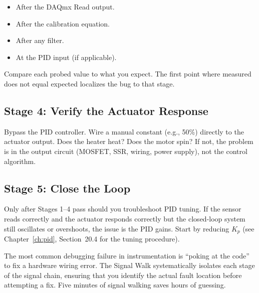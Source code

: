 \begin{itemize}[nosep,leftmargin=1.5em]
\item After the DAQmx Read output.
\item After the calibration equation.
\item After any filter.
\item At the PID input (if applicable).
\end{itemize}

Compare each probed value to what you expect. The first point where measured does not equal expected localizes the bug to that stage.

\subsection{Stage 4: Verify the Actuator Response}

Bypass the PID controller. Wire a manual constant (e.g., 50\%) directly to the actuator output. Does the heater heat? Does the motor spin? If not, the problem is in the output circuit (MOSFET, SSR, wiring, power supply), not the control algorithm.

\subsection{Stage 5: Close the Loop}

Only after Stages 1--4 pass should you troubleshoot PID tuning. If the sensor reads correctly and the actuator responds correctly but the closed-loop system still oscillates or overshoots, the issue is the PID gains. Start by reducing $K_p$ (see Chapter~\ref{ch:pid}, Section~20.4 for the tuning procedure).

\begin{keyconceptbox}
The most common debugging failure in instrumentation is ``poking at the code'' to fix a hardware wiring error. The Signal Walk systematically isolates each stage of the signal chain, ensuring that you identify the actual fault location before attempting a fix. Five minutes of signal walking saves hours of guessing.
\end{keyconceptbox}

